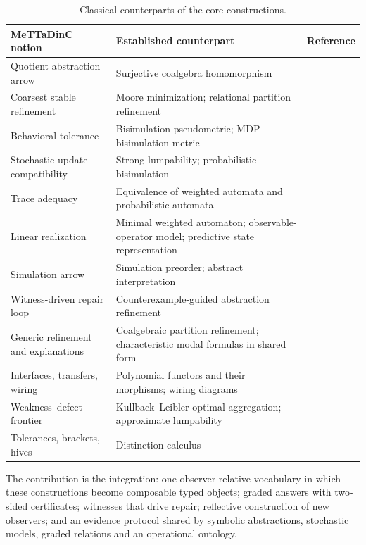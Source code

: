 \documentclass[11pt]{article}
\theoremstyle{definition}
\theoremstyle{plain}
\begin{document}
\begin{table}[ht]
\centering\small
\begin{tabularx}{\textwidth}{>{\raggedright\arraybackslash}p{4.3cm}>{\raggedright\arraybackslash}X>{\raggedright\arraybackslash}p{3.3cm}}
\toprule
MeTTaDinC notion & Established counterpart & Reference\\
\midrule
Quotient abstraction arrow & Surjective coalgebra homomorphism & \cite{rutten}\\
Coarsest stable refinement & Moore minimization; relational partition refinement & \cite{hopcroft,paigetarjan}\\
Behavioral tolerance & Bisimulation pseudometric; MDP bisimulation metric & \cite{dgjp,vbw,ferns}\\
Stochastic update compatibility & Strong lumpability; probabilistic bisimulation & \cite{kemenysnell,larsenskou,buchholz}\\
Trace adequacy & Equivalence of weighted automata and probabilistic automata & \cite{schutzenberger,tzeng,kiefer}\\
Linear realization & Minimal weighted automaton; observable-operator model; predictive state representation & \cite{schutzenberger,jaeger,psr}\\
Simulation arrow & Simulation preorder; abstract interpretation & \cite{milner,cousot}\\
Witness-driven repair loop & Counterexample-guided abstraction refinement & \cite{cegar}\\
Generic refinement and explanations & Coalgebraic partition refinement; characteristic modal formulas in shared form & \cite{copar,copar2,explaining}\\
Interfaces, transfers, wiring & Polynomial functors and their morphisms; wiring diagrams & \cite{niuspivak}\\
Weakness--defect frontier & Kullback--Leibler optimal aggregation; approximate lumpability & \cite{dmm,geiger,franceschinis}\\
Tolerances, brackets, hives & Distinction calculus & \cite{dcnotes,dclosure}\\
\bottomrule
\end{tabularx}
\caption{Classical counterparts of the core constructions.}\label{tab:prior}
\end{table}

The contribution is the integration: one observer-relative vocabulary in which these
constructions become composable typed objects; graded answers with two-sided certificates;
witnesses that drive repair; reflective construction of new observers; and an evidence
protocol shared by symbolic abstractions, stochastic models, graded relations and an
operational ontology.
\end{document}
